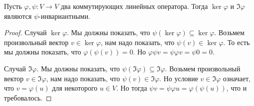 \begin{claim}
\label{claim::KerImInvar}
Пусть $\varphi,\psi\colon V\to V$ два коммутирующих линейных оператора.
Тогда $\ker \varphi$ и $\Im\varphi$ являются $\psi$-инвариантными.
\end{claim}
\begin{proof}
Случай $\ker \varphi$.
Мы должны показать, что $\psi(\ker\varphi) \subseteq \ker \varphi$.
Возьмем произвольный вектор $v\in \ker\varphi$, нам надо показать, что $\psi(v) \in \ker \varphi$.
То есть мы должны показать, что $\varphi(\psi(v)) = 0$.
Но $\varphi \psi v = \psi \varphi v = \psi 0 = 0$.

Случай $\Im \varphi$.
Мы должны показать, что $\psi(\Im \varphi) \subseteq \Im \varphi$.
Возьмем произвольный вектор $v\in \Im\varphi$, нам надо показать, что $\psi(v) \in \Im\varphi$.
Но условие $v\in \Im \varphi$ означает, что $v = \varphi (u)$ для некоторого $u\in V$.
Но тогда $\psi v = \psi \varphi u = \varphi (\psi(u))$, что и требовалось.
\end{proof}


